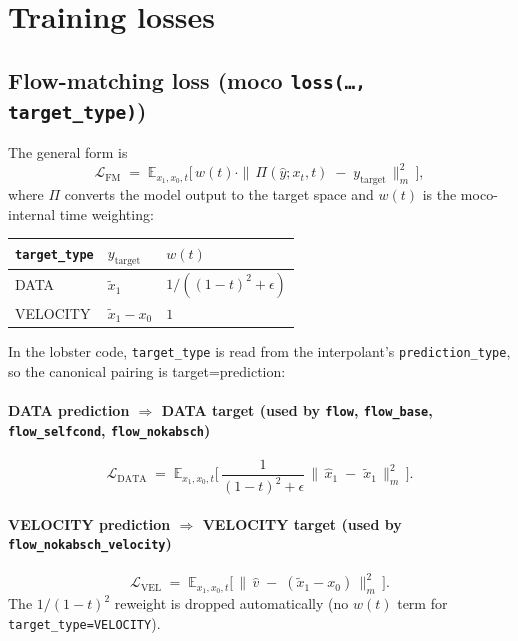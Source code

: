\documentclass[11pt]{article}
\begin{document}
\section{Training losses}

\subsection{Flow-matching loss (moco \texttt{loss(\dots, target\_type)})}

The general form is
\begin{equation}
\mathcal{L}_{\text{FM}} \;=\; \mathbb{E}_{x_1, x_0, t}\Big[\, w(t)\cdot \|\,\Pi(\hat{y}; x_t, t) \;-\; y_{\text{target}}\,\|_m^2 \,\Big],
\end{equation}
where $\Pi$ converts the model output to the target space and $w(t)$ is the moco-internal time weighting:
\begin{center}
\begin{tabular}{lll}
\toprule
\texttt{target\_type} & $y_{\text{target}}$ & $w(t)$ \\
\midrule
DATA & $\tilde x_1$ & $1 / ((1-t)^2 + \epsilon)$ \\
VELOCITY & $\tilde x_1 - x_0$ & $1$ \\
\bottomrule
\end{tabular}
\end{center}

In the lobster code, \texttt{target\_type} is read from the interpolant's \texttt{prediction\_type}, so the canonical pairing is target=prediction:

\paragraph{DATA prediction $\Rightarrow$ DATA target (used by \texttt{flow}, \texttt{flow\_base}, \texttt{flow\_selfcond}, \texttt{flow\_nokabsch})}
\begin{equation}
\boxed{\;
\mathcal{L}_{\text{DATA}} \;=\; \mathbb{E}_{x_1, x_0, t}\Big[\, \frac{1}{(1-t)^2 + \epsilon} \, \|\,\hat{x}_1 \;-\; \tilde x_1 \,\|_m^2 \,\Big].
\;}
\end{equation}

\paragraph{VELOCITY prediction $\Rightarrow$ VELOCITY target (used by \texttt{flow\_nokabsch\_velocity})}
\begin{equation}
\boxed{\;
\mathcal{L}_{\text{VEL}} \;=\; \mathbb{E}_{x_1, x_0, t}\Big[\, \|\,\hat{v} \;-\; (\tilde x_1 - x_0)\,\|_m^2 \,\Big].
\;}
\end{equation}
The $1/(1-t)^2$ reweight is dropped automatically (no $w(t)$ term for \texttt{target\_type=VELOCITY}).
\end{document}
